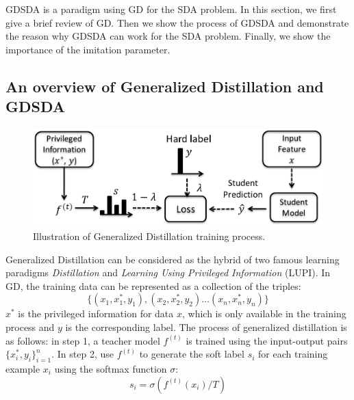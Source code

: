 GDSDA is a paradigm using GD for the SDA problem. In this section, we first give a brief review of GD. Then we show the process of GDSDA and demonstrate the reason why GDSDA can work for the SDA problem. Finally, we show the importance of the imitation parameter. 

\subsection{An overview of Generalized Distillation and GDSDA}
\begin{figure}\label{fig:gd}
	\centering
	\includegraphics[scale=.35]{figure/GD.png}
	\caption{Illustration of Generalized Distillation training process.}
\end{figure}
%
%
{Generalized Distillation} can be considered as the hybrid of two famous learning paradigms \textit{Distillation}\cite{hinton2015distilling} and \textit{Learning Using Privileged Information} (LUPI)\cite{vapnik2015learning}.
In GD, the training data can be represented as a collection of the triples:
\[\{\left(x_1,x_1^*,y_1\right),\left(x_2,x_2^*,y_2\right) \dots \left(x_n,x_n^*,y_n\right)\}\]
$x^*$ is the privileged information for data $x$, which is only available in the training process and $y$ is the corresponding label. 
The process of generalized distillation is as follows: in step 1, a teacher model ${f}^{(t)}$ is trained using the input-output pairs $\{x^*_i,y_i\}_{i=1}^n$. In step 2, use ${f}^{(t)}$ to generate the soft label $s_i$ for each training example $x_i$ using the softmax function $\sigma$:
\begin{equation}\label{eq:softmax_T}
s_i=\sigma(f^{(t)}(x_i)/T)
\end{equation}
